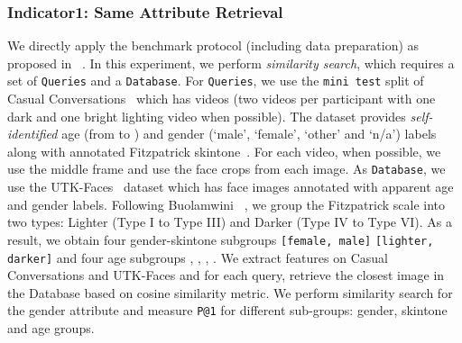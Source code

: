 \documentclass[10pt,twocolumn,letterpaper]{article}
\newcommand{\casualconv}{Casual Conversations\xspace}
\newcommand{\utk}{UTK-Faces\xspace}
\begin{document}
\subsubsection{Indicator1: Same Attribute Retrieval}
\label{sec:indicator1_description}
We directly apply the benchmark protocol (including data preparation) as proposed in ~\cite{goyal2022fairness}. 
In this experiment, we perform \textit{similarity search}, which requires a set of \texttt{Queries} and a \texttt{Database}. 
For \texttt{Queries}, we use  the \texttt{mini test} split of \casualconv~\cite{hazirbas2021towards} which has  videos (two videos per participant with one dark and one bright lighting video when possible). 
The dataset provides \textit{self-identified} age (from  to ) and gender (`male', `female', `other' and `n/a') labels along with annotated Fitzpatrick skintone~\cite{FitzPatrick75}. 
For each video, when possible, we use the middle frame and use the face crops from each image. 
As \texttt{Database}, we use the \utk~\cite{zhifei2017cvpr} dataset which has  face images annotated with apparent age and gender labels. 
Following Buolamwini \etal~\cite{buolamwini2018gender}, we group the Fitzpatrick scale into two types: Lighter (Type I to Type III) and Darker (Type IV to Type VI). 
As a result, we obtain four gender-skintone subgroups \texttt{[female, male]}  \texttt{[lighter, darker]} and four age subgroups , , , . 
We extract features on \casualconv and \utk and for each query, retrieve the closest image in the Database based on cosine similarity metric. 
We perform similarity search for the gender attribute and measure \texttt{P@1} for different sub-groups: gender, skintone and age groups. 
\end{document}
